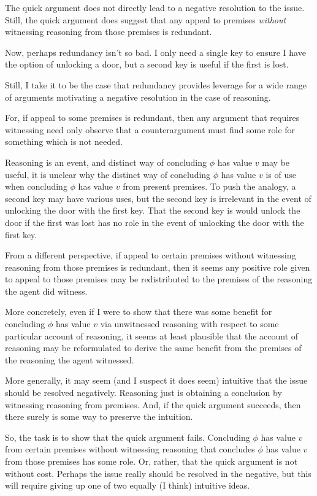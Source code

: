 \begin{note}
  The quick argument does not directly lead to a negative resolution to the issue.
  Still, the quick argument does suggest that any appeal to premises \emph{without} witnessing reasoning from those premises is redundant.

  Now, perhaps redundancy isn't so bad.
  I only need a single key to ensure I have the option of unlocking a door, but a second key is useful if the first is lost.

  Still, I take it to be the case that redundancy provides leverage for a wide range of arguments motivating a negative resolution in the case of reasoning.

  For, if appeal to some premises is redundant, then any argument that requires witnessing need only observe that a counterargument must find some role for something which is not needed.

  Reasoning is an event, and distinct way of concluding \(\phi\) has value \(v\) may be useful, it is unclear why the distinct way of concluding \(\phi\) has value \(v\) is of use when concluding \(\phi\) has value \(v\) from present premises.
  To push the analogy, a second key may have various uses, but the second key is irrelevant in the event of unlocking the door with the first key.
  That the second key is would unlock the door if the first was lost has no role in the event of unlocking the door with the first key.

  From a different perspective, if appeal to certain premises without witnessing reasoning from those premises is redundant, then it seems any positive role given to appeal to those premises may be redistributed to the premises of the reasoning the agent did witness.

  More concretely, even if I were to show that there was some benefit for concluding \(\phi\) has value \(v\) via unwitnessed reasoning with respect to some particular account of reasoning, it seems at least plausible that the account of reasoning may be reformulated to derive the same benefit from the premises of the reasoning the agent witnessed.

  More generally, it may seem (and I suspect it does seem) intuitive that the issue should be resolved negatively.
  Reasoning just is obtaining a conclusion by witnessing reasoning from premises.
  And, if the quick argument succeeds, then there surely is some way to preserve the intuition.

  So, the task is to show that the quick argument fails.
  Concluding \(\phi\) has value \(v\) from certain premises without witnessing reasoning that concludes \(\phi\) has value \(v\) from those premises has some role.
  Or, rather, that the quick argument is not without cost.
  Perhaps the issue really should be resolved in the negative, but this will require giving up one of two equally (I think) intuitive ideas.


\end{note}
